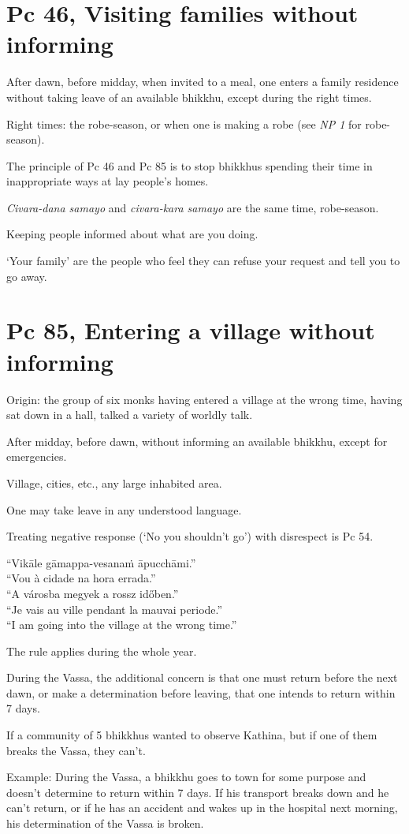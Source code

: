 \clearpage

\section{Pc 46, Visiting families without informing}

After dawn, before midday, when invited to a meal, one enters a family
residence without taking leave of an available bhikkhu, except during
the right times.

Right times: the robe-season, or when one is making a robe (see \emph{NP
1} for robe-season).

The principle of Pc 46 and Pc 85 is to stop bhikkhus spending their time
in inappropriate ways at lay people's homes.

\emph{Civara-dana samayo} and \emph{civara-kara samayo} are the same
time, robe-season.

Keeping people informed about what are you doing.

`Your family' are the people who feel they can refuse your request and
tell you to go away.

\section{Pc 85, Entering a village without informing}

\begin{multicols}{2}

Origin: the group of six monks having entered a village at the wrong
time, having sat down in a hall, talked a variety of worldly talk.

After midday, before dawn, without informing an available bhikkhu,
except for emergencies.

Village, cities, etc., any large inhabited area.

One may take leave in any understood language.

Treating negative response (`No you shouldn't go') with disrespect is Pc
54.

``Vikāle gāmappa-vesanaṁ āpucchāmi.''\\
``Vou à cidade na hora errada.''\\
``A városba megyek a rossz időben.''\\
``Je vais au ville pendant la mauvai periode.''\\
``I am going into the village at the wrong time.''

The rule applies during the whole year.

During the Vassa, the additional concern is that one must return before
the next dawn, or make a determination before leaving, that one intends
to return within 7 days.

If a community of 5 bhikkhus wanted to observe Kathina, but if one of
them breaks the Vassa, they can't.

Example: During the Vassa, a bhikkhu goes to town for some purpose and
doesn't determine to return within 7 days. If his transport breaks down
and he can't return, or if he has an accident and wakes up in the
hospital next morning, his determination of the Vassa is broken.

\end{multicols}

